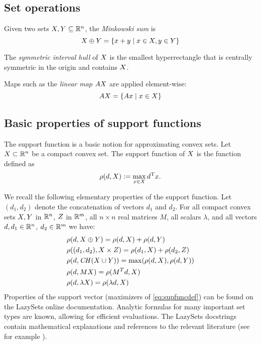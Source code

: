 \subsection{Set operations}\label{sec:setops}

Given two sets $X, Y \subseteq \mathbb{R}^n$, the \emph{Minkowski sum} is
%
\[
	X \oplus Y = \{ x + y \mid x \in X, y \in Y \}
\]

The \emph{symmetric interval hull} of $X$ is the smallest hyperrectangle that is centrally symmetric in the origin and contains $X$.

Maps such as the \emph{linear map} $A X$ are applied element-wise:
%
\[
	A X = \{ A x \mid x \in X \}
\]


\subsection{Basic properties of support functions}\label{sec:supfunc_properties}

The support function is a basic notion for approximating convex sets. Let $X \subset \mathbb{R}^n$ be a compact convex set. The support function of $X$ is the function defined as
\begin{equation}\label{eq:supfuncdef}
\rho(d, X) := \max\limits_{x \in X} d^\mathrm{T} x.
\end{equation}

We recall the following elementary properties of the support function.
Let $(d_1, d_2)$ denote the concatenation of vectors $d_1$ and $d_2$.
For all compact convex sets $X, Y$ in $\mathbb{R}^n$, $Z$ in $\mathbb{R}^m$, all $n\times n$ real
matrices $M$, all scalars $\lambda$, and all vectors
$d, d_1 \in \mathbb{R}^n$, $d_2 \in \mathbb{R}^m$ we have:
%
\begin{align*}
    &\rho(d, X \oplus Y) = \rho(d, X) + \rho(d, Y) \\
    &\rho((d_1, d_2), X \times Z) = \rho(d_1, X) + \rho(d_2, Z) \\
    &\rho(d, \mathit{CH}(X \cup Y)) = \max(\rho(d, X), \rho(d, Y)) \\
    &\rho(d, M X) = \rho(M^T d, X) \\
    &\rho(d, \lambda X) = \rho(\lambda d, X)
\end{align*}
%
Properties of the support vector (maximizers of \eqref{eq:supfuncdef}) can be found on the LazySets online documentation.
%
Analytic formulas for many important set types are known, allowing for efficient evaluations.
%
The LazySets docstrings contain mathematical explanations and references to the relevant literature (see for example ).


